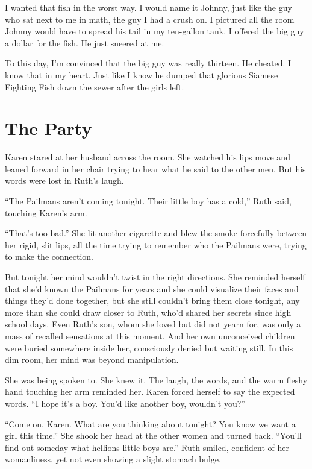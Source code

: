 \documentclass[twoside,10pt]{book}
\begin{document}
I wanted that fish in the worst way. I would name it Johnny, just like
the guy who sat next to me in math, the guy I had a crush on. I pictured
all the room Johnny would have to spread his tail in my ten-gallon tank.
I offered the big guy a dollar for the fish. He just sneered at me.

To this day, I'm convinced that the big guy was really thirteen. He
cheated. I know that in my heart. Just like I know he dumped that
glorious Siamese Fighting Fish down the sewer after the girls left.



\cleardoublepage
\chapter{The Party}

Karen stared at her husband across the room. She watched his lips move
and leaned forward in her chair trying to hear what he said to the other
men. But his words were lost in Ruth's laugh.

``The Pailmans aren't coming tonight. Their little boy has a cold,''
Ruth said, touching Karen's arm.

``That's too bad.'' She lit another cigarette and blew the smoke
forcefully between her rigid, slit lips, all the time trying to remember
who the Pailmans were, trying to make the connection.

But tonight her mind wouldn't twist in the right directions. She
reminded herself that she'd known the Pailmans for years and she could
visualize their faces and things they'd done together, but she still
couldn't bring them close tonight, any more than she could draw closer
to Ruth, who'd shared her secrets since high school days. Even Ruth's
son, whom she loved but did not yearn for, was only a mass of recalled
sensations at this moment. And her own unconceived children were buried
some­where inside her, consciously denied but waiting still. In this dim
room, her mind was beyond manipulation.

She was being spoken to. She knew it. The laugh, the words, and the warm
fleshy hand touch­ing her arm reminded her. Karen forced herself to say
the expected words. ``I hope it's a boy. You'd like another boy,
wouldn't you?''

``Come on, Karen. What are you thinking about tonight? You know we want
a girl this time.'' She shook her head at the other women and turned
back. ``You'll find out someday what hellions little boys are.'' Ruth
smiled, confident of her womanliness, yet not even showing a slight
stomach bulge.
\end{document}
